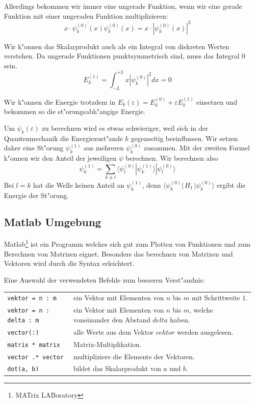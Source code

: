 \begin{refsection}
Allerdings bekommen wir immer eine ungerade Funktion, wenn wir eine gerade Funktion mit einer ungeraden Funktion multiplizieren:
\[ 
  x \cdot \overline{\psi_k^{(0)}(x)} \psi_k^{(0)}(x) = x \cdot |\psi_k^{(0)}(x)|^2
\]

Wir k"onnen das Skalarprodukt auch als ein Integral von diskreten Werten verstehen.
Da ungerade Funktionen punktsymmetrisch sind, muss das Integral $0$ sein.
\[
  E_k^{(1)} = \int_{-L}^{+L} x |\psi_k^{(0)}|^2 dx = 0
\]

Wir k"onnen die Energie trotzdem in
$E_k(\varepsilon)=E_k^{(0)} + \varepsilon E_k^{(1)}$ einsetzen
und bekommen so die st"orungsabh"angige Energie.








Um $\psi_k(\varepsilon)$ zu berechnen wird es etwas schwieriger,
weil sich in der Quantenmechanik die Energiezust"ande $k$ gegenseitig beeinflussen.
Wir setzen daher eine St"orung $\psi_k^{(1)}$ aus mehreren $\psi_k^{(0)}$ zusammen.
Mit der zweiten Formel k"onnen wir den Anteil der jeweiligen $\psi$ berechnen.
Wir berechnen also 
\[
\psi_k^{(1)} =
\sum_{k\ne l}
\langle\psi_l^{(0)}|\psi_k^{(1)}\rangle |\psi_l^{(0)}\rangle
\]
Bei $l = k$ hat die Welle keinen Anteil an $\psi_k^{(1)}$,
denn $\langle \psi_k^{(0)}|\, H_1 \,|\psi_k^{(0)}\rangle$ ergibt die Energie der St"orung.





\subsection{Matlab Umgebung}

Matlab\footnote{MATrix LABoratory} ist ein Programm welches sich gut zum Plotten von Funktionen
und zum Berechnen von Matrizen eignet.
Besonders das berechnen von Matrixen und Vektoren wird durch die Syntax erleichtert.

Eine Auswahl der verwendeten Befehle zum besseren Verst"andnis:

\begin{center}
	\begin{tabular}{lp{9cm}}
		\verb|vektor = n : m| & ein Vektor mit Elementen von $n$ bis $m$ mit Schrittweite $1$. \\
		\verb|vektor = n : delta : m| & ein Vektor mit Elementen von $n$ bis $m$, welche voneinander den Abstand $delta$ haben. \\
		\verb|vector(:)| & alle Werte aus dem Vektor $vektor$ werden ausgelesen. \\
		\verb|matrix * matrix| & Matrix-Multiplikation. \\
		\verb|vector .* vector| & multipliziere die Elemente der Vektoren. \\
		\verb|dot(a, b)| & bildet das Skalarprodukt von $a$ und $b$.
	\end{tabular}
\end{center}





\end{refsection}
